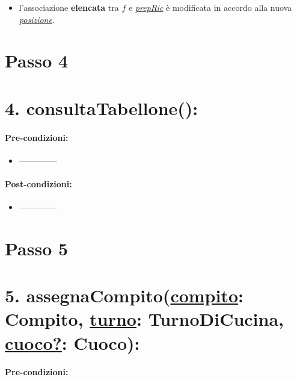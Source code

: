 \begin{itemize}
  \item l'associazione \textbf{elencata} tra $f$ e \underline{\textit{prepRic}} è modificata in accordo alla nuova \underline{\textit{posizione}}.
\end{itemize}

\section{Passo 4}

\section*{4. consultaTabellone():}

\paragraph{Pre-condizioni:}

\begin{itemize}
  \item --------------
\end{itemize}

\paragraph{Post-condizioni:}

\begin{itemize}
  \item --------------
\end{itemize}


\section{Passo 5}

\section*{5. assegnaCompito(\underline{compito}: Compito, \underline{turno}: TurnoDiCucina, \underline{cuoco?}: Cuoco):}

\paragraph{Pre-condizioni:}

